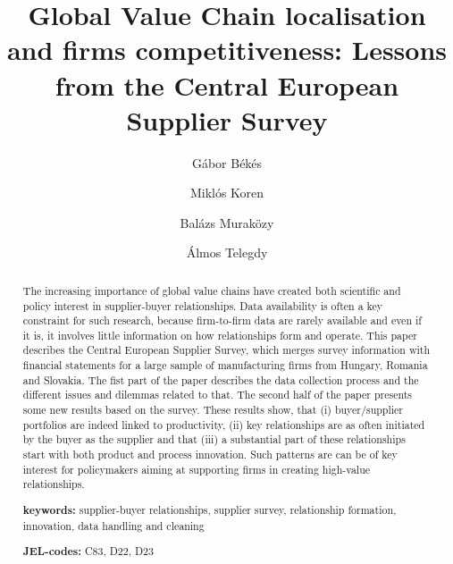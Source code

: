 \usepackage{}\documentclass[final, dvipsnames, authoryear,12pt]{elsarticle}
\begin{document}
\begin{frontmatter}
\title{Global Value Chain localisation and firms competitiveness: Lessons from the Central European Supplier Survey}






\author[gb]{G\'{a}bor B\'{e}k\'{e}s}
\author[mk]{Miklós Koren}
\author[bm]{Balázs Muraközy}
\author[at]{Álmos Telegdy}
 \address[gb]{Central European University, Institute of Economics and CEPR}
 \address[mk]{Central European University, Institute of Economics and CEPR}
 \address[bm]{University of Liverpool, Institute of Economics }
 \address[at]{National Bank of Hungary}
 
 




\begin{abstract}
    The increasing importance of global value chains have created both scientific and policy interest in supplier-buyer relationships. Data availability is often a key constraint for such research, because firm-to-firm data are rarely available and even if it is, it involves little information on how relationships form and operate. This paper describes the Central European Supplier Survey, which merges survey information with financial statements for a large sample of manufacturing firms from Hungary, Romania and Slovakia. The fist part of the paper describes the data collection process and the different issues and dilemmas related to that. The second half of the paper presents some new results based on the survey. These results show, that (i) buyer/supplier portfolios are indeed linked to productivity, (ii) key relationships are as often initiated by the buyer as the supplier and that (iii) a substantial part of these relationships start with both product and process innovation. Such patterns are can be of key interest for policymakers aiming at supporting firms in creating high-value relationships.
    
       \vspace{2mm} 
   
   \textbf{keywords:} supplier-buyer relationships, supplier survey, relationship formation, innovation, data handling and cleaning 
   
    \vspace{2mm}
    
   \textbf{JEL-codes:} C83, D22, D23 
\end{abstract}


\end{frontmatter}
\end{document}
